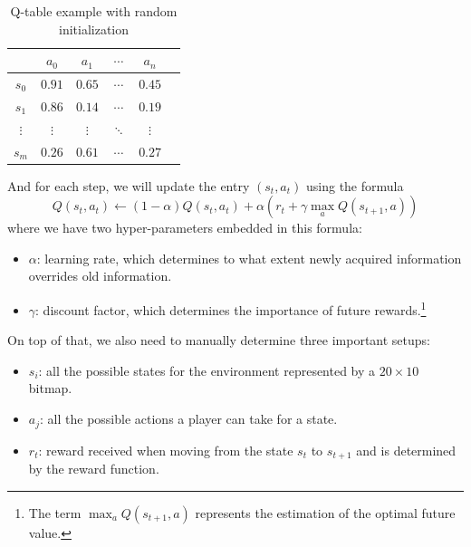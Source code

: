 \documentclass[letterpaper]{article} %
\begin{document}
\begin{table}[h!]
  \centering
  \normalsize{
    \begin{tabular}{ |c|c|c|c|c|c| } 
      \hline
       & $a_{0}$ & $a_{1}$ & $\cdots$ & $a_{n}$  \\ 
      \hline
       $s_{0}$ & $0.91$ & $0.65$ &$\cdots $ &$0.45$  \\ 
       \hline
       $s_{1}$ & $0.86$ & $0.14$ &$\cdots $ &$0.19$  \\ 
       \hline
       $\vdots$ & $\vdots$ & $\vdots$ &$\ddots $ &$\vdots$  \\ 
       \hline
       $s_{m}$ & $0.26$ & $0.61$ &$\cdots $ &$0.27$  \\ 
       \hline
      \end{tabular}}
  \caption{Q-table example with random initialization}
  \label{tab:qtable}
\end{table}
And for each step, we will update the entry $(s_{t}, a_{t})$ using the formula
\[
    Q(s_{t},a_{t}) \leftarrow (1-\alpha) Q(s_{t},a_{t}) + \alpha   \left ( r_{t} + \gamma  \max_{a}Q(s_{t+1}, a)\right ) 
\]
where we have two hyper-parameters embedded in this formula:
\begin{itemize}
  \item $\alpha$: learning rate, which determines to what extent newly acquired information overrides old information.
  \item $\gamma$: discount factor, which determines the importance of future rewards.\footnote{The term $\max_{a}Q(s_{t+1}, a) $ represents the estimation of the optimal future value.}
\end{itemize}

On top of that, we also need to manually determine three important setups:
\begin{itemize}
  \item $s_{i}$: all the possible states for the environment represented by a $20\times 10$ bitmap.
  \item $a_{j}$: all the possible actions a player can take for a state.
  \item $r_{t}$: reward received when moving from the state $s_{t}$ to $s_{t+1}$ and is determined by the reward function.
\end{itemize}
\end{document}
